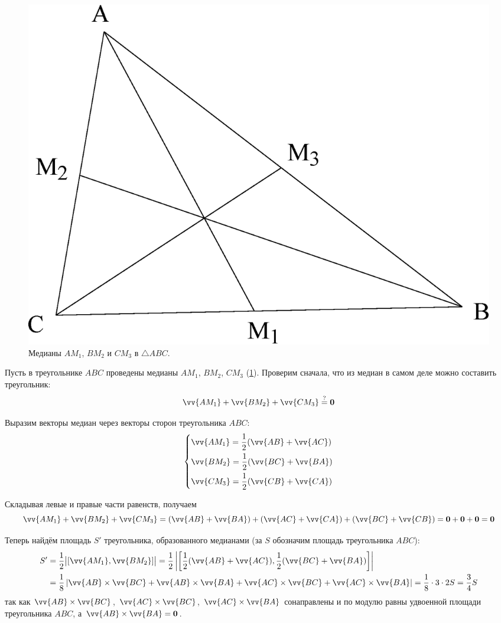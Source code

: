 \documentclass[a4paper,12pt]{article}
\begin{document}
  \begin{solution}
    \begin{figure}[h]
      \centering
      
      \includegraphics[width=0.5\columnwidth]{abc-m1m2m3}
      
      \caption{Медианы $AM_1$, $BM_2$ и $CM_3$ в $\triangle ABC$.}
      \label{fig:abc-m1m2m3}
    \end{figure}
    
    Пусть в треугольнике $ABC$ проведены медианы $A M_1$, $B M_2$, $C M_3$ (\ref{fig:abc-m1m2m3}).
    Проверим сначала, что из медиан в самом деле можно составить треугольник:
    \[
      \vv{AM_1} + \vv{BM_2} + \vv{CM_3} \stackrel{\?}{=} \bds 0
    \]
    
    Выразим векторы медиан через векторы сторон треугольника $ABC$:
    \[
      \left\{
        \begin{aligned}
          &\vv{AM_1} = \frac{1}{2}(\vv{AB} + \vv{AC})\\
          &\vv{BM_2} = \frac{1}{2}(\vv{BC} + \vv{BA})\\
          &\vv{CM_3} = \frac{1}{2}(\vv{CB} + \vv{CA})
        \end{aligned}
      \right.
    \]
    
    Складывая левые и правые части равенств, получаем
    \[
      \vv{AM_1} + \vv{BM_2} + \vv{CM_3} = (\vv{AB} + \vv{BA}) + (\vv{AC} + \vv{CA}) + (\vv{BC} + \vv{CB})
      = \bds 0 + \bds 0 + \bds 0 = \bds 0
    \]
    
    Теперь найдём площадь $S'$ треугольника, образованного медианами (за $S$ обозначим площадь треугольника $ABC$):
    \begin{equation*}
    \begin{split}
      S' &= \frac{1}{2} \bigl|[\vv{AM_1}, \vv{BM_2}]\bigr|
      = \frac{1}{2} \left|\left[\frac{1}{2}(\vv{AB} + \vv{AC}), \frac{1}{2}(\vv{BC} + \vv{BA})\right]\right|\\
      &= \frac{1}{8} \left|\vv{AB} \times \vv{BC} + \vv{AB} \times \vv{BA} + \vv{AC} \times \vv{BC} + \vv{AC} \times \vv{BA}\right|
      = \frac{1}{8} \cdot 3 \cdot 2 S
      = \frac{3}{4} S
    \end{split}
    \end{equation*}
    так как $\vv{AB} \hm\times \vv{BC}$, $\vv{AC} \hm\times \vv{BC}$, $\vv{AC} \hm\times \vv{BA}$ сонаправлены и по модулю равны удвоенной площади треугольника $ABC$, а $\vv{AB} \hm\times \vv{BA} \hm= \bds 0$.
  \end{solution}
  
\end{document}
